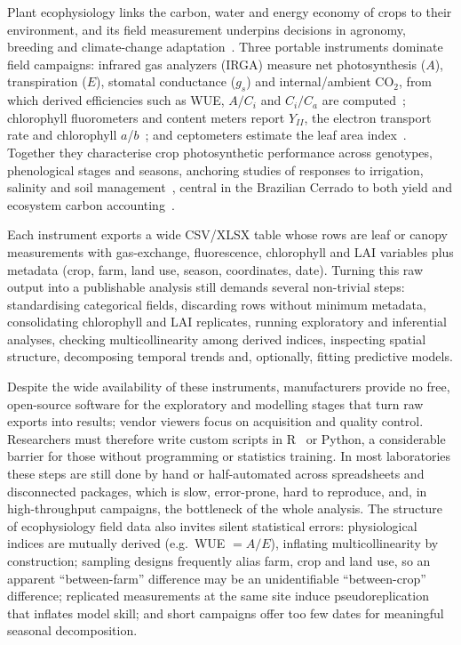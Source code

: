 \documentclass[11pt, letterpaper]{article}
\begin{document}
Plant ecophysiology links the carbon, water and energy economy of crops to their environment, and its field measurement underpins decisions in agronomy, breeding and climate-change adaptation~\cite{Lambers2008,Long2006}. Three portable instruments dominate field campaigns: infrared gas analyzers (IRGA) measure net photosynthesis ($A$), transpiration ($E$), stomatal conductance ($g_s$) and internal/ambient CO$_2$, from which derived efficiencies such as WUE, $A/C_i$ and $C_i/C_a$ are computed~\cite{Farquhar1980,vonCaemmerer2000,Long2003}; chlorophyll fluorometers and content meters report $Y_{II}$, the electron transport rate and chlorophyll $a$/$b$~\cite{Maxwell2000,Baker2008}; and ceptometers estimate the leaf area index~\cite{Breda2003}. Together they characterise crop photosynthetic performance across genotypes, phenological stages and seasons, anchoring studies of responses to irrigation, salinity and soil management~\cite{Oliveira2017,Munjonji2021,Peters2012,Sanchez2003,Guarrera2024}, central in the Brazilian Cerrado to both yield and ecosystem carbon accounting~\cite{Vourlitis2022}.

Each instrument exports a wide CSV/XLSX table whose rows are leaf or canopy measurements with gas-exchange, fluorescence, chlorophyll and LAI variables plus metadata (crop, farm, land use, season, coordinates, date). Turning this raw output into a publishable analysis still demands several non-trivial steps: standardising categorical fields, discarding rows without minimum metadata, consolidating chlorophyll and LAI replicates, running exploratory and inferential analyses, checking multicollinearity among derived indices, inspecting spatial structure, decomposing temporal trends and, optionally, fitting predictive models.

Despite the wide availability of these instruments, manufacturers provide no free, open-source software for the exploratory and modelling stages that turn raw exports into results; vendor viewers focus on acquisition and quality control. Researchers must therefore write custom scripts in R~\cite{Rcore} or Python, a considerable barrier for those without programming or statistics training. In most laboratories these steps are still done by hand or half-automated across spreadsheets and disconnected packages, which is slow, error-prone, hard to reproduce, and, in high-throughput campaigns, the bottleneck of the whole analysis. The structure of ecophysiology field data also invites silent statistical errors: physiological indices are mutually derived (e.g.\ WUE $= A/E$), inflating multicollinearity by construction; sampling designs frequently alias farm, crop and land use, so an apparent ``between-farm'' difference may be an unidentifiable ``between-crop'' difference; replicated measurements at the same site induce pseudoreplication~\cite{Hurlbert1984} that inflates model skill; and short campaigns offer too few dates for meaningful seasonal decomposition.
\end{document}
